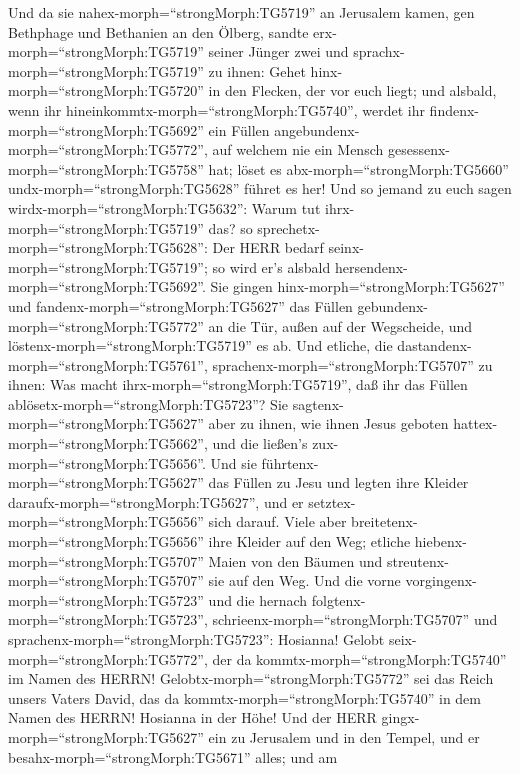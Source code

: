  Und da sie nahex-morph=``strongMorph:TG5719'' an Jerusalem
kamen, gen Bethphage und Bethanien an den Ölberg, sandte
erx-morph=``strongMorph:TG5719'' seiner Jünger zwei  und
sprachx-morph=``strongMorph:TG5719'' zu ihnen: Gehet
hinx-morph=``strongMorph:TG5720'' in den Flecken, der vor euch liegt;
und alsbald, wenn ihr hineinkommtx-morph=``strongMorph:TG5740'', werdet
ihr findenx-morph=``strongMorph:TG5692'' ein Füllen
angebundenx-morph=``strongMorph:TG5772'', auf welchem nie ein Mensch
gesessenx-morph=``strongMorph:TG5758'' hat; löset es
abx-morph=``strongMorph:TG5660'' undx-morph=``strongMorph:TG5628''
führet es her!  Und so jemand zu euch sagen
wirdx-morph=``strongMorph:TG5632'': Warum tut
ihrx-morph=``strongMorph:TG5719'' das? so
sprechetx-morph=``strongMorph:TG5628'': Der HERR bedarf
seinx-morph=``strongMorph:TG5719''; so wird er's alsbald
hersendenx-morph=``strongMorph:TG5692''.  Sie gingen
hinx-morph=``strongMorph:TG5627'' und
fandenx-morph=``strongMorph:TG5627'' das Füllen
gebundenx-morph=``strongMorph:TG5772'' an die Tür, außen auf der
Wegscheide, und löstenx-morph=``strongMorph:TG5719'' es ab. 
Und etliche, die dastandenx-morph=``strongMorph:TG5761'',
sprachenx-morph=``strongMorph:TG5707'' zu ihnen: Was macht
ihrx-morph=``strongMorph:TG5719'', daß ihr das Füllen
ablösetx-morph=``strongMorph:TG5723''?  Sie
sagtenx-morph=``strongMorph:TG5627'' aber zu ihnen, wie ihnen Jesus
geboten hattex-morph=``strongMorph:TG5662'', und die ließen's
zux-morph=``strongMorph:TG5656''.  Und sie
führtenx-morph=``strongMorph:TG5627'' das Füllen zu Jesu und legten ihre
Kleider daraufx-morph=``strongMorph:TG5627'', und er
setztex-morph=``strongMorph:TG5656'' sich darauf.  Viele
aber breitetenx-morph=``strongMorph:TG5656'' ihre Kleider auf den Weg;
etliche hiebenx-morph=``strongMorph:TG5707'' Maien von den Bäumen und
streutenx-morph=``strongMorph:TG5707'' sie auf den Weg.  Und
die vorne vorgingenx-morph=``strongMorph:TG5723'' und die hernach
folgtenx-morph=``strongMorph:TG5723'',
schrieenx-morph=``strongMorph:TG5707'' und
sprachenx-morph=``strongMorph:TG5723'': Hosianna! Gelobt
seix-morph=``strongMorph:TG5772'', der da
kommtx-morph=``strongMorph:TG5740'' im Namen des HERRN! 
Gelobtx-morph=``strongMorph:TG5772'' sei das Reich unsers Vaters David,
das da kommtx-morph=``strongMorph:TG5740'' in dem Namen des HERRN!
Hosianna in der Höhe!  Und der HERR
gingx-morph=``strongMorph:TG5627'' ein zu Jerusalem und in den Tempel,
und er besahx-morph=``strongMorph:TG5671'' alles; und am
